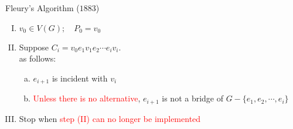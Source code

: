 
\begin{frame}{}
  

  \begin{columns}
      \begin{center}
	\pause
	 \\[5pt]
	\pause
	 \\[5pt]
	\pause
      \end{center}
  \end{columns}
\end{frame}

\begin{frame}{}
  \begin{exampleblock}{Fleury's Algorithm ($1883$)}
    \begin{enumerate}[(I)]
      \setlength{\itemsep}{8pt}
      \item $v_0 \in V(G); \quad P_0 = v_0$
      \item Suppose $C_i = v_0 e_1 v_1 e_2 \cdots e_i v_i$. \\[4pt]
	 as follows:
	\begin{enumerate}[(a)]
	  \setlength{\itemsep}{4pt}
	  \item $e_{i+1}$ is incident with $v_i$
	  \item \textcolor<4->{red}{Unless there is no alternative}, $e_{i+1}$ is not a bridge of $G - \{e_1, e_2, \cdots, e_i\}$ 
	\end{enumerate}
      \item Stop when \textcolor<3->{red}{step (II) can no longer be implemented}
    \end{enumerate}
  \end{exampleblock}

  \begin{columns}
  \end{columns}
\end{frame}

